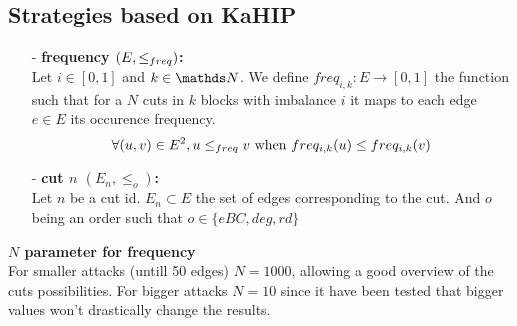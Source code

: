     \subsection*{Strategies based on KaHIP}
    \begin{itemize}
        \item[-] \textbf{frequency $(E, \leq_{freq})$:}\\
        Let $i \in  [0, 1]$ and $k \in \N$. We define $freq_{i, k}: E \to [0, 1]$ the function such that for a $N$ cuts in $k$ blocks with imbalance $i$ it maps to each edge $e \in E$ its occurence frequency.
        $$\forall (u, v) \in E^2, u \leq_{freq} v \text{ when } freq_{i, k}(u) \leq freq_{i, k}(v)$$
        \item[-] \textbf{cut $n$ $(E_n, \leq_o)$:}\\
        Let $n$ be a cut id. $E_n \subset E$ the set of edges corresponding to the cut. And $o$ being an order such that $o \in \{eBC, deg, rd\}$
    \end{itemize}
    \textbf{$N$ parameter for frequency}\\
    For smaller attacks (untill 50 edges) $N = 1000$, allowing a good overview of the cuts possibilities. For bigger attacks $N = 10$ since it have been tested that bigger values won't drastically change the results.\\